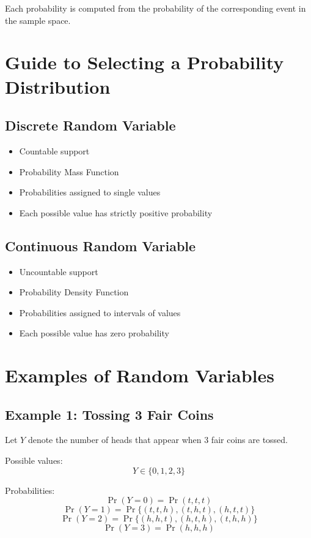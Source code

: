 \documentclass[11pt]{article}
\begin{document}
Each probability is computed from the probability of the corresponding event in the sample space.

\section{Guide to Selecting a Probability Distribution}

\subsection{Discrete Random Variable}
\begin{itemize}
    \item Countable support
    \item Probability Mass Function
    \item Probabilities assigned to single values
    \item Each possible value has strictly positive probability
\end{itemize}

\subsection{Continuous Random Variable}
\begin{itemize}
    \item Uncountable support
    \item Probability Density Function
    \item Probabilities assigned to intervals of values
    \item Each possible value has zero probability
\end{itemize}

\section{Examples of Random Variables}

\subsection{Example 1: Tossing 3 Fair Coins}

Let $Y$ denote the number of heads that appear when 3 fair coins are tossed.

Possible values:
\[
Y \in \{0,1,2,3\}
\]

Probabilities:
\[
\Pr(Y=0) = \Pr(t,t,t)
\]
\[
\Pr(Y=1) = \Pr\{(t,t,h),(t,h,t),(h,t,t)\}
\]
\[
\Pr(Y=2) = \Pr\{(h,h,t),(h,t,h),(t,h,h)\}
\]
\[
\Pr(Y=3) = \Pr(h,h,h)
\]
\end{document}
